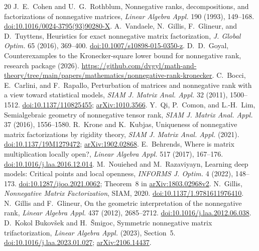 \documentclass[11pt]{article}
\theoremstyle{definition}\newtheorem{definition}[theorem]{Definition}
\theoremstyle{remark}\newtheorem{remark}[theorem]{Remark}
\begin{document}
\begin{thebibliography}{20}
 J.~E.~Cohen and U.~G.~Rothblum, Nonnegative ranks, decompositions, and factorizations of nonnegative matrices, \emph{Linear Algebra Appl.} 190 (1993), 149--168. \href{https://doi.org/10.1016/0024-3795(93)90280-X}{doi:10.1016/0024-3795(93)90280-X}.
 A.~Vandaele, N.~Gillis, F.~Glineur, and D.~Tuyttens, Heuristics for exact nonnegative matrix factorization, \emph{J. Global Optim.} 65 (2016), 369--400. \href{https://doi.org/10.1007/s10898-015-0350-z}{doi:10.1007/s10898-015-0350-z}.
 D.~D.~Goyal, Counterexamples to the Kronecker-square lower bound for nonnegative rank, research package (2026). \url{https://github.com/dvgyl/math-and-theory/tree/main/papers/mathematics/nonnegative-rank-kronecker}.
 C.~Bocci, E.~Carlini, and F.~Rapallo, Perturbation of matrices and nonnegative rank with a view toward statistical models, \emph{SIAM J. Matrix Anal. Appl.} 32 (2011), 1500--1512. \href{https://doi.org/10.1137/110825455}{doi:10.1137/110825455}; \href{https://arxiv.org/abs/1010.3566}{arXiv:1010.3566}.
 Y.~Qi, P.~Comon, and L.-H.~Lim, Semialgebraic geometry of nonnegative tensor rank, \emph{SIAM J. Matrix Anal. Appl.} 37 (2016), 1556--1580.
 R.~Krone and K.~Kubjas, Uniqueness of nonnegative matrix factorizations by rigidity theory, \emph{SIAM J. Matrix Anal. Appl.} (2021). \href{https://doi.org/10.1137/19M1279472}{doi:10.1137/19M1279472}; \href{https://arxiv.org/abs/1902.02868}{arXiv:1902.02868}.
 E.~Behrends, Where is matrix multiplication locally open?, \emph{Linear Algebra Appl.} 517 (2017), 167--176. \href{https://doi.org/10.1016/j.laa.2016.12.014}{doi:10.1016/j.laa.2016.12.014}.
 M.~Nouiehed and M.~Razaviyayn, Learning deep models: Critical points and local openness, \emph{INFORMS J. Optim.} 4 (2022), 148--173. \href{https://doi.org/10.1287/ijoo.2021.0062}{doi:10.1287/ijoo.2021.0062}; Theorem~8 in \href{https://arxiv.org/abs/1803.02968}{arXiv:1803.02968v2}.
 N.~Gillis, \emph{Nonnegative Matrix Factorization}, SIAM, 2020. \href{https://doi.org/10.1137/1.9781611976410}{doi:10.1137/1.9781611976410}.
 N.~Gillis and F.~Glineur, On the geometric interpretation of the nonnegative rank, \emph{Linear Algebra Appl.} 437 (2012), 2685--2712. \href{https://doi.org/10.1016/j.laa.2012.06.038}{doi:10.1016/j.laa.2012.06.038}.
 D.~Kokol Bukov\v{s}ek and H.~\v{S}migoc, Symmetric nonnegative matrix trifactorization, \emph{Linear Algebra Appl.} (2023), Section~5. \href{https://doi.org/10.1016/j.laa.2023.01.027}{doi:10.1016/j.laa.2023.01.027}; \href{https://arxiv.org/abs/2106.14437}{arXiv:2106.14437}.

\end{thebibliography}
\end{document}

